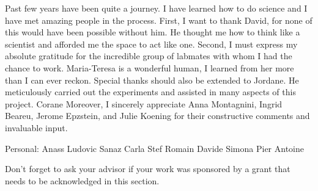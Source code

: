Past few years have been quite a journey.
I have learned how to do science and I have met amazing people in the process.
First, I want to thank David, for none of this would have been possible without him.
He thought me how to think like a scientist and afforded me the space to act like one.
Second, I must express my absolute gratitude for the incredible group of labmates with whom I had the chance to work.
Maria-Teresa is a wonderful human, I learned from her more than I can ever reckon.
Special thanks should also be extended to Jordane.
He meticulously carried out the experiments and assisted in many aspects of this project.
Corane 
Moreover, I sincerely appreciate Anna Montagnini, Ingrid Beareu, Jerome Epzstein, and Julie Koening for their constructive comments and invaluable input.
\par

Personal:
Anass
Ludovic
Sanaz
Carla
Stef
Romain
Davide
Simona
Pier Antoine






Don't forget to ask your advisor if your work was sponsored by a grant that needs to be acknowledged in this section.  